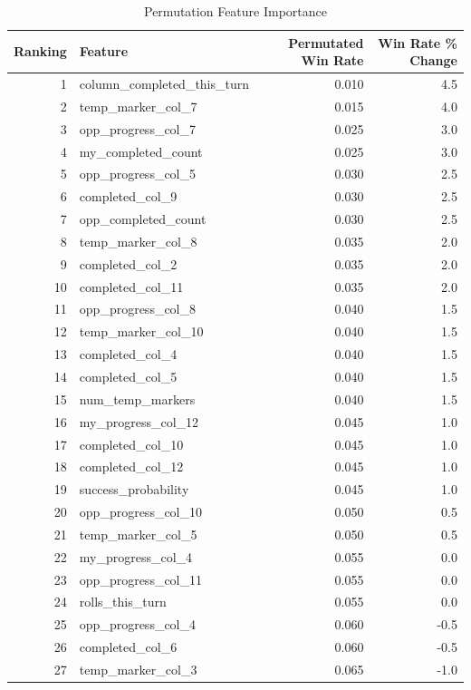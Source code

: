 \documentclass[12pt]{article}
\begin{document}
\begin{thesis}
\begin{longtable}[t]{r|l|r|r}
\caption{\label{tab:featuretable}Permutation Feature Importance}\\
\hline
Ranking & Feature & Permutated Win Rate & Win Rate \% Change\\
\hline
1 & column\_completed\_this\_turn & 0.010 & 4.5\\
\hline
2 & temp\_marker\_col\_7 & 0.015 & 4.0\\
\hline
3 & opp\_progress\_col\_7 & 0.025 & 3.0\\
\hline
4 & my\_completed\_count & 0.025 & 3.0\\
\hline
5 & opp\_progress\_col\_5 & 0.030 & 2.5\\
\hline
6 & completed\_col\_9 & 0.030 & 2.5\\
\hline
7 & opp\_completed\_count & 0.030 & 2.5\\
\hline
8 & temp\_marker\_col\_8 & 0.035 & 2.0\\
\hline
9 & completed\_col\_2 & 0.035 & 2.0\\
\hline
10 & completed\_col\_11 & 0.035 & 2.0\\
\hline
11 & opp\_progress\_col\_8 & 0.040 & 1.5\\
\hline
12 & temp\_marker\_col\_10 & 0.040 & 1.5\\
\hline
13 & completed\_col\_4 & 0.040 & 1.5\\
\hline
14 & completed\_col\_5 & 0.040 & 1.5\\
\hline
15 & num\_temp\_markers & 0.040 & 1.5\\
\hline
16 & my\_progress\_col\_12 & 0.045 & 1.0\\
\hline
17 & completed\_col\_10 & 0.045 & 1.0\\
\hline
18 & completed\_col\_12 & 0.045 & 1.0\\
\hline
19 & success\_probability & 0.045 & 1.0\\
\hline
20 & opp\_progress\_col\_10 & 0.050 & 0.5\\
\hline
21 & temp\_marker\_col\_5 & 0.050 & 0.5\\
\hline
22 & my\_progress\_col\_4 & 0.055 & 0.0\\
\hline
23 & opp\_progress\_col\_11 & 0.055 & 0.0\\
\hline
24 & rolls\_this\_turn & 0.055 & 0.0\\
\hline
25 & opp\_progress\_col\_4 & 0.060 & -0.5\\
\hline
26 & completed\_col\_6 & 0.060 & -0.5\\
\hline
27 & temp\_marker\_col\_3 & 0.065 & -1.0\\

\end{longtable}
\end{thesis}
\end{document}
